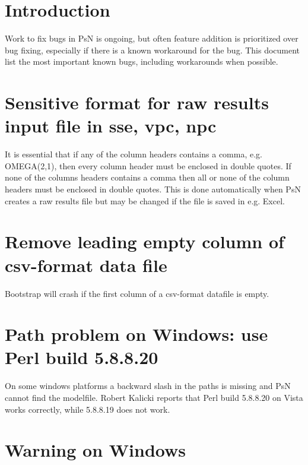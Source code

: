 



\maketitle


\section{Introduction}
Work to fix bugs in PsN is ongoing, but often feature addition is prioritized over bug fixing, especially if there is a known workaround for the bug. This document list the most important known bugs, including workarounds when possible.   

\section{Sensitive format for raw results input file in sse, vpc, npc}

It is essential that if any of the column headers contains a comma, e.g. OMEGA(2,1), then every column header must be enclosed in double quotes. If none of the columns headers contains a comma then all or none of the column headers must be enclosed in double quotes. This is done automatically when PsN creates a raw results file but may be changed if the file is saved in e.g. Excel.


\section{Remove leading empty column of csv-format data file}

Bootstrap will crash if the first column of a csv-format datafile is empty.

\section{Path problem on Windows: use Perl build 5.8.8.20}

On some windows platforms a backward slash in the paths is missing and PsN cannot find the modelfile. Robert Kalicki reports that Perl build 5.8.8.20 on Vista works correctly, while 5.8.8.19 does not work.

\section{Warning on Windows}

